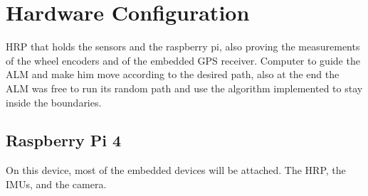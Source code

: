 \section{Hardware Configuration}
\label{sec:system}

\noindent
\gls{HRP} that holds the sensors and the raspberry pi, also proving the measurements of the wheel encoders and of the embedded GPS receiver.
Computer to guide the \gls{ALM} and make him move according to the desired path, also at the end the \gls{ALM} was free to run its random path and use the algorithm implemented to stay inside the boundaries.




\subsection{Raspberry Pi 4}
\noindent
On this device, most of the embedded devices will be attached.
The \gls{HRP}, the \glspl{IMU}, and the camera.

